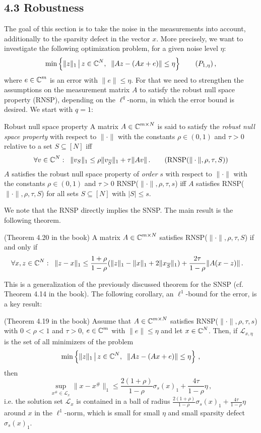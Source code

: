 \documentclass[a4paper]{article}
\begin{document}
\subsection*{4.3  Robustness}
The goal of this section is to take the noise in the measurements into account, additionally to the sparsity defect in the vector \(x\).
More precisely, we want to investigate the following optimization problem, for a given noise level \(\eta\):
\[\min\left\{\|z\|_1\,\big|\,z\in \CC^N,\;\;\|Az-(Ax+e)\|\le \eta\right\}\tag{$P_{1,\eta}$}\,,\]
where \(e\in \operatorname{\mathbb C}^m \) is an error with \(\|e\|\le \eta\).
 For that we need to strengthen the assumptions on the measurement matrix \(A\) to satisfy the robust null space property (RNSP), depending on the \(\ell^q\)-norm, in which the error bound is desired. We start with \(q=1\):
\begin{Def*}
    {Robust null space property}{} A matrix \(A\in\operatorname{\mathbb C}^{m\times N}\) is said to satisfy the \emph{robust null space property} with respect to \(\|\cdot\|\) with the constants \(\rho\in (0,1)\) and \(\tau>0\) relative to a set \(S\subseteq[N]\) iff
    \[\forall v\in \operatorname{\mathbb C}^N:\;\; \|v_S\|_1\le \rho\|v_{\overline S}\|_1+\tau \|Av\|\,.\tag{RNSP($\|\cdot\|,\rho,\tau,S$)}\]
    \(A \) satisfies the robust null space property of \emph{order} \(s\) with respect to \(\|\cdot\|\) with the constants \(\rho\in (0,1)\) and \(\tau>0\) RNSP(\(\|\cdot\|,\rho,\tau, s\)) iff \(A \) satisfies RNSP(\(\|\cdot\|,\rho,\tau,S\)) for all sets \(S\subseteq[N]\) with \(|S|\le s\).
    \end{Def*}
    We note that the RNSP directly implies the SNSP. The main result is the following theorem.
    \begin{Satz*}
    {(Theorem 4.20 in the book)}{}
    A matrix \(A\in\operatorname{\mathbb C}^{m\times N}\) satisfies RNSP(\(\|\cdot\|,\rho,\tau,S\)) if and only if 
    \begin{align*}
    &\forall x,z\in \operatorname{\mathbb C}^N:\;\;\|z-x\|_1\le \frac{1+\rho}{1-\rho}(\|z\|_1-\|x\|_1+2\|x_{\overline S}\|_1)+\frac{2\tau}{1-\rho}\|A(x-z)\|\,.
    \end{align*}
    \end{Satz*}
    This is a generalization of the previously discussed theorem for the SNSP (cf. Theorem 4.14 in the book). The following corollary, an \(\ell^1\)-bound for the error, is a key result:
    \begin{Kor*}
        {(Theorem 4.19 in the book)}{}
        Assume that \(A\in\operatorname{\mathbb C}^{m\times N}\) satisfies RNSP(\(\|\cdot\|,\rho,\tau,s\)) with \(0<\rho<1\) and \(\tau>0\), \(e\in\operatorname{\mathbb C}^m\) with \(\|e\|\le \eta\) and let \(x\in \operatorname{\mathbb C}^N\). Then, if \(\mathcal L_{x,\eta}\) is the set of all minimizers of the problem
		\[\min\left\{\|z\|_1\,\big|\,z\in \operatorname{\mathbb C}^N,\;\;\|Az-(Ax+e)\|\le \eta\right\}\,,\]
    	then 
        \[\sup_{x^{\#}\in \mathcal L_x}\|x-x^{\#}\|_1\le \frac{2(1+\rho)}{1-\rho}\sigma_s(x)_1+\frac{4\tau}{1-\rho}\eta\,,\]
        i.e. the solution set \(\mathcal L_x\) is contained in a ball of radius \(\frac{2(1+\rho)}{1-\rho}\sigma_s(x)_1+\frac{4\tau}{1-\rho}\eta\) around \(x\) in the \(\ell^1\)-norm, which is small for small \(\eta\) and small sparsity defect \(\sigma_s(x)_1\).
    \end{Kor*}
\end{document}

